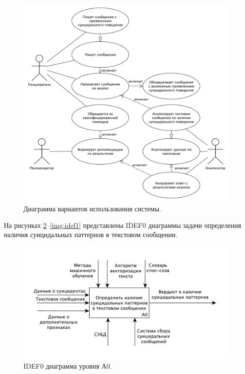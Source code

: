 \begin{figure}[H]
	\centering
	\includegraphics[width=\textwidth]{inc/useCase.pdf}
	\caption{ Диаграмма вариантов использования системы. }
	\label{img:useCase}
\end{figure}

На рисунках \ref{img:idef0}--\ref{img:idef1} представлены IDEF0 диаграммы задачи определения наличия суицидальных паттернов в текстовом сообщении.

\begin{figure}[H]
	\centering
	\includegraphics[width=\textwidth]{inc/A0.pdf}
	\caption{ IDEF0 диаграмма уровня А0. }
	\label{img:idef0}
\end{figure}


